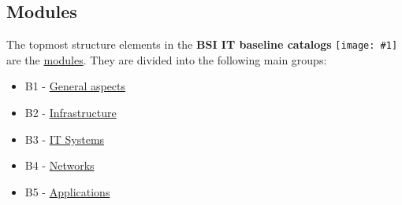 \documentclass[a4paper,10pt]{book}
\newcommand{\icon}[1]{\texttt{[image: \#1]}}
\begin{document}
\subsection{Modules}
The topmost structure elements in the \textbf{BSI IT baseline catalogs} \icon{Icon/GS_Kataloge.png} are the
\href{https://www.bsi.bund.de/cln_156/DE/Themen/weitereThemen/ITGrundschutzKataloge/Inhalt/Bausteine/bausteine_node.html}{modules}.
They are divided into the following main groups:
\begin{itemize}
\item B1 - \href{https://www.bsi.bund.de/cln_156/DE/Themen/weitereThemen/ITGrundschutzKataloge/Inhalt/Bausteine/B1uebergeordneteAspekte/b1uebergeordneteaspekte_node.html}{General aspects}
\item B2 - \href{https://www.bsi.bund.de/cln_156/DE/Themen/weitereThemen/ITGrundschutzKataloge/Inhalt/Bausteine/B2Infrastruktur/b2infrastruktur_node.html}{Infrastructure}
\item B3 - \href{https://www.bsi.bund.de/cln_156/DE/Themen/weitereThemen/ITGrundschutzKataloge/Inhalt/Bausteine/B3ITSysteme/b3itsysteme_node.html}{IT Systems}
\item B4 - \href{https://www.bsi.bund.de/cln_156/DE/Themen/weitereThemen/ITGrundschutzKataloge/Inhalt/Bausteine/B4Netze/b4netze_node.html}{Networks}
\item B5 - \href{https://www.bsi.bund.de/cln_156/DE/Themen/weitereThemen/ITGrundschutzKataloge/Inhalt/Bausteine/B5Anwendungen/b5anwendungen_node.html}{Applications}
\end{itemize}
\end{document}
